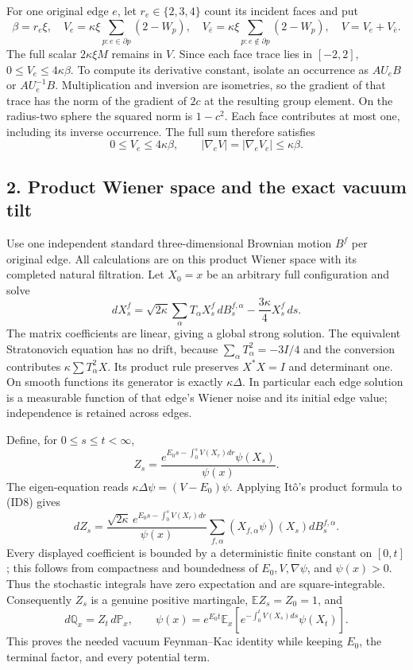 \documentclass[11pt]{article}
\begin{document}
For one original edge \(e\), let \(r_e\in\{2,3,4\}\) count its incident faces and put
\[
 \beta=r_e\xi,\quad
 V_e=\kappa\xi\sum_{p:e\in\partial p}(2-W_p),\quad
 V_{\bar e}=\kappa\xi\sum_{p:e\notin\partial p}(2-W_p),\quad V=V_e+V_{\bar e}.
 \tag{ID5}
\]
The full scalar \(2\kappa\xi M\) remains in \(V\). Since each face trace lies in \([-2,2]\), \(0\le V_e\le4\kappa\beta\). To compute its derivative constant, isolate an occurrence as \(A U_e B\) or \(A U_e^{-1}B\). Multiplication and inversion are isometries, so the gradient of that trace has the norm of the gradient of \(2c\) at the resulting group element. On the radius-two sphere the squared norm is \(1-c^2\). Each face contributes at most one, including its inverse occurrence. The full sum therefore satisfies
\[
 0\le V_e\le4\kappa\beta,\qquad
 |\nabla_eV|=|\nabla_eV_e|\le\kappa\beta.
 \tag{ID6}
\]

\subsection*{2. Product Wiener space and the exact vacuum tilt}

Use one independent standard three-dimensional Brownian motion \(B^f\) per original edge. All calculations are on this product Wiener space with its completed natural filtration. Let \(X_0=x\) be an arbitrary full configuration and solve
\[
 dX_s^f=\sqrt{2\kappa}\sum_\alpha T_\alpha X_s^f\,dB_s^{f,\alpha}
                       -\frac{3\kappa}{4}X_s^f\,ds.
 \tag{ID7}
\]
The matrix coefficients are linear, giving a global strong solution. The equivalent Stratonovich equation has no drift, because \(\sum_\alpha T_\alpha^2=-3I/4\) and the conversion contributes \(\kappa\sum T_\alpha^2X\). Its product rule preserves \(X^*X=I\) and determinant one. On smooth functions its generator is exactly \(\kappa\Delta\). In particular each edge solution is a measurable function of that edge's Wiener noise and its initial edge value; independence is retained across edges.

Define, for \(0\le s\le t<\infty\),
\[
 Z_s=\frac{e^{E_0s-\int_0^sV(X_r)dr}\psi(X_s)}{\psi(x)}.
 \tag{ID8}
\]
The eigen-equation reads \(\kappa\Delta\psi=(V-E_0)\psi\). Applying Itô's product formula to (ID8) gives
\[
 dZ_s=\frac{\sqrt{2\kappa}\,e^{E_0s-\int_0^sV(X_r)dr}}{\psi(x)}
                  \sum_{f,\alpha}(X_{f,\alpha}\psi)(X_s)dB_s^{f,\alpha}.
 \tag{ID9}
\]
Every displayed coefficient is bounded by a deterministic finite constant on \([0,t]\); this follows from compactness and boundedness of \(E_0,V,\nabla\psi\), and \(\psi(x)>0\). Thus the stochastic integrals have zero expectation and are square-integrable. Consequently \(Z_s\) is a genuine positive martingale, \(\mathbb E Z_s=Z_0=1\), and
\[
 d\mathbb Q_x=Z_t\,d\mathbb P_x,\qquad
 \psi(x)=e^{E_0t}\mathbb E_x[e^{-\int_0^tV(X_s)ds}\psi(X_t)].
 \tag{ID10}
\]
This proves the needed vacuum Feynman–Kac identity while keeping \(E_0\), the terminal factor, and every potential term.
\end{document}
